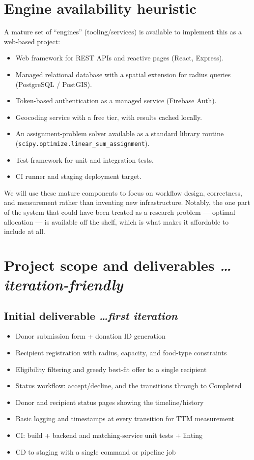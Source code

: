 \documentclass[11pt,a4paper]{article}
\newcommand{\BvrHint}[1]{%
  {\normalfont\normalsize\itshape\hfill #1}}
\begin{document}
\section{Engine availability heuristic}
A mature set of ``engines'' (tooling/services) is available to implement this as a web-based project:
\begin{itemize}[leftmargin=0.7cm]
    \item Web framework for REST APIs and reactive pages (React, Express).
    \item Managed relational database with a spatial extension for radius queries (PostgreSQL / PostGIS).
    \item Token-based authentication as a managed service (Firebase Auth).
    \item Geocoding service with a free tier, with results cached locally.
    \item An assignment-problem solver available as a standard library routine (\texttt{scipy.optimize.linear\_sum\_assignment}).
    \item Test framework for unit and integration tests.
    \item CI runner and staging deployment target.
\end{itemize}
We will use these mature components to focus on workflow design, correctness, and measurement rather than inventing new infrastructure. Notably, the one part of the system that could have been treated as a research problem --- optimal allocation --- is available off the shelf, which is what makes it affordable to include at all.

\section{Project scope and deliverables %
\BvrHint{\ldots iteration-friendly}}
\subsection{Initial deliverable %
\BvrHint{\ldots first iteration}}
\begin{itemize}[leftmargin=0.7cm]
    \item Donor submission form + donation ID generation
    \item Recipient registration with radius, capacity, and food-type constraints
    \item Eligibility filtering and greedy best-fit offer to a single recipient
    \item Status workflow: accept/decline, and the transitions through to Completed
    \item Donor and recipient status pages showing the timeline/history
    \item Basic logging and timestamps at every transition for TTM measurement
    \item CI: build + backend and matching-service unit tests + linting
    \item CD to staging with a single command or pipeline job
\end{itemize}
\end{document}

